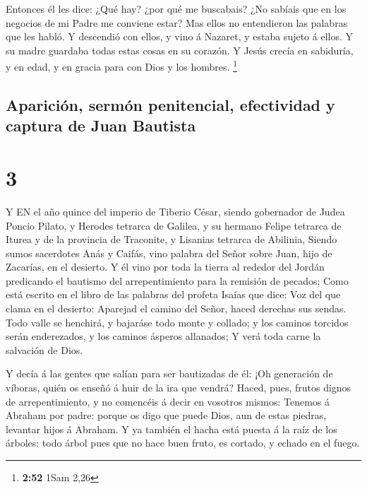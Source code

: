  Entonces él les dice: ¿Qué hay? ¿por qué me buscabais? ¿No
sabíais que en los negocios de mi Padre me conviene estar? 
Mas ellos no entendieron las palabras que les habló.  Y
descendió con ellos, y vino á Nazaret, y estaba sujeto á ellos. Y su
madre guardaba todas estas cosas en su corazón.  Y Jesús
crecía en sabiduría, y en edad, y en gracia para con Dios y los hombres.
\footnote{\textbf{2:52} 1Sam 2,26}

\hypertarget{apariciuxf3n-sermuxf3n-penitencial-efectividad-y-captura-de-juan-bautista}{%
\subsection{Aparición, sermón penitencial, efectividad y captura de Juan
Bautista}\label{apariciuxf3n-sermuxf3n-penitencial-efectividad-y-captura-de-juan-bautista}}

\hypertarget{section-2}{%
\section{3}\label{section-2}}

 Y EN el año quince del imperio de Tiberio César, siendo
gobernador de Judea Poncio Pilato, y Herodes tetrarca de Galilea, y su
hermano Felipe tetrarca de Iturea y de la provincia de Traconite, y
Lisanias tetrarca de Abilinia,  Siendo sumos sacerdotes Anás
y Caifás, vino palabra del Señor sobre Juan, hijo de Zacarías, en el
desierto.  Y él vino por toda la tierra al rededor del
Jordán predicando el bautismo del arrepentimiento para la remisión de
pecados;  Como está escrito en el libro de las palabras del
profeta Isaías que dice: Voz del que clama en el desierto: Aparejad el
camino del Señor, haced derechas sus sendas.  Todo valle se
henchirá, y bajaráse todo monte y collado; y los caminos torcidos serán
enderezados, y los caminos ásperos allanados;  Y verá toda
carne la salvación de Dios.

 Y decía á las gentes que salían para ser bautizadas de él:
¡Oh generación de víboras, quién os enseñó á huir de la ira que vendrá?
 Haced, pues, frutos dignos de arrepentimiento, y no
comencéis á decir en vosotros mismos: Tenemos á Abraham por padre:
porque os digo que puede Dios, aun de estas piedras, levantar hijos á
Abraham.  Y ya también el hacha está puesta á la raíz de los
árboles: todo árbol pues que no hace buen fruto, es cortado, y echado en
el fuego.

